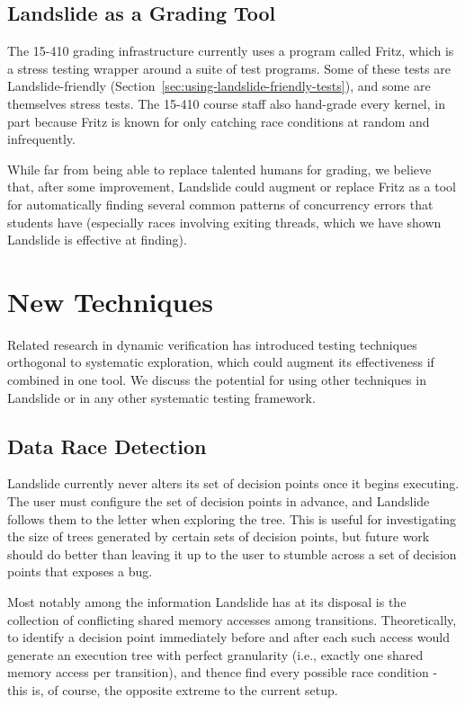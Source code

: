 \subsection{Landslide as a Grading Tool}

The 15-410 grading infrastructure currently uses a program called Fritz, which is a stress testing wrapper around a suite of test programs. Some of these tests are Landslide-friendly (Section~\ref{sec:using-landslide-friendly-tests}), and some are themselves stress tests. The 15-410 course staff also hand-grade every kernel, in part because Fritz is known for only catching race conditions at random and infrequently.

While far from being able to replace talented humans for grading, we believe that, after some improvement, Landslide could augment or replace Fritz as a tool for automatically finding several common patterns of concurrency errors that students have (especially races involving exiting threads, which we have shown Landslide is effective at finding).

\section{New Techniques}
\label{sec:future-new}

Related research in dynamic verification has introduced testing techniques orthogonal to systematic exploration, which could augment its effectiveness if combined in one tool. We discuss the potential for using other techniques in Landslide or in any other systematic testing framework.

\subsection{Data Race Detection}
\label{sec:future-analysis}

Landslide currently never alters its set of decision points once it begins executing. The user must configure the set of decision points in advance, and Landslide follows them to the letter when exploring the tree. This is useful for investigating the size of trees generated by certain sets of decision points, but future work should do better than leaving it up to the user to stumble across a set of decision points that exposes a bug.

Most notably among the information Landslide has at its disposal is the collection of conflicting shared memory accesses among transitions. Theoretically, to identify a decision point immediately before and after each such access would generate an execution tree with perfect granularity (i.e., exactly one shared memory access per transition), and thence find every possible race condition - this is, of course, the opposite extreme to the current setup.

